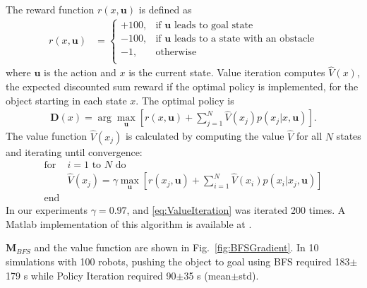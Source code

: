 The reward function $r(x,\mathbf{u})$ is defined as
\begin{align}
r(x,\mathbf{u}) &=  \left\{
\begin{array}{ll}
     +100, &  \textrm{if } \mathbf{u} \textrm{ leads to goal state}\\
      -100, & \textrm{if } \mathbf{u} \textrm{ leads to a state with an obstacle} \\
      -1, & \textrm{otherwise}\\
\end{array} 
\right.
\end{align}
 where $\mathbf{u}$ is the action and $x$ is the current state.   %
  Value iteration computes $\hat{V}(x)$, the expected discounted sum reward if the optimal policy is implemented, for the object starting in each state $x$. The optimal policy is %
   \begin{align} \mathbf{D}(x) = \arg\max_{\mathbf{u}}   [ r(x,\mathbf{u}) + \sum\limits_{j=1}^N \hat{V}(x_j) p(x_j|x, \mathbf{u})].  \label{eq:OptimalPolicy}
   \end{align}
   The value function $\hat{V}(x_j) $ is calculated by computing the value $\hat{V}$ for all $N$ states and iterating until convergence:
\begin{align}
\text{for }&\text{$i=1$ to $N$ do} \nonumber \\
&\hat{V} (x_j) = \gamma \max_{\mathbf{u}} [r(x_j,\mathbf{u}) + \sum\limits_{i=1}^N \hat{V}(x_i) p(x_i| x_j,\mathbf{u})] \label{eq:ValueIteration} \nonumber\\
\text{end}& 
\end{align}
In our experiments $\gamma = 0.97$, and \eqref{eq:ValueIteration} was iterated 200 times. A {\sc Matlab} implementation of this algorithm is available at \cite{Becker2015MDP}.

$\mathbf{M}_{BFS}$ and the value function are shown in Fig.~\ref{fig:BFSGradient}. 
In 10 simulations with 100 robots, pushing the object to goal using BFS required 183$\pm$179 s while Policy Iteration required 90$\pm$35 s (mean$\pm$std).


